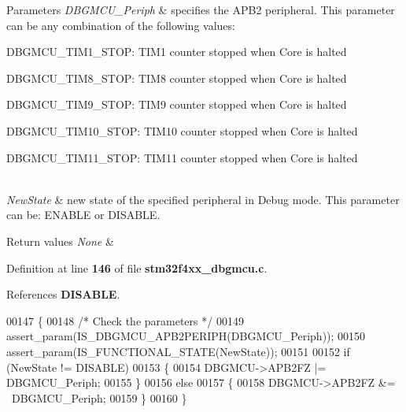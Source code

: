 \begin{DoxyParams}{Parameters}
{\em D\+B\+G\+M\+C\+U\+\_\+\+Periph} & specifies the A\+P\+B2 peripheral. This parameter can be any combination of the following values\+: \begin{DoxyItemize}
\item D\+B\+G\+M\+C\+U\+\_\+\+T\+I\+M1\+\_\+\+S\+T\+OP\+: T\+I\+M1 counter stopped when Core is halted \item D\+B\+G\+M\+C\+U\+\_\+\+T\+I\+M8\+\_\+\+S\+T\+OP\+: T\+I\+M8 counter stopped when Core is halted \item D\+B\+G\+M\+C\+U\+\_\+\+T\+I\+M9\+\_\+\+S\+T\+OP\+: T\+I\+M9 counter stopped when Core is halted \item D\+B\+G\+M\+C\+U\+\_\+\+T\+I\+M10\+\_\+\+S\+T\+OP\+: T\+I\+M10 counter stopped when Core is halted \item D\+B\+G\+M\+C\+U\+\_\+\+T\+I\+M11\+\_\+\+S\+T\+OP\+: T\+I\+M11 counter stopped when Core is halted \end{DoxyItemize}
\\
\hline
{\em New\+State} & new state of the specified peripheral in Debug mode. This parameter can be\+: E\+N\+A\+B\+LE or D\+I\+S\+A\+B\+LE. \\
\hline
\end{DoxyParams}

\begin{DoxyRetVals}{Return values}
{\em None} & \\
\hline
\end{DoxyRetVals}


Definition at line \textbf{ 146} of file \textbf{ stm32f4xx\+\_\+dbgmcu.\+c}.



References \textbf{ D\+I\+S\+A\+B\+LE}.


\begin{DoxyCode}
00147 \{
00148   \textcolor{comment}{/* Check the parameters */}
00149   assert_param(IS_DBGMCU_APB2PERIPH(DBGMCU\_Periph));
00150   assert_param(IS_FUNCTIONAL_STATE(NewState));
00151 
00152   \textcolor{keywordflow}{if} (NewState != DISABLE)
00153   \{
00154     DBGMCU->APB2FZ |= DBGMCU\_Periph;
00155   \}
00156   \textcolor{keywordflow}{else}
00157   \{
00158     DBGMCU->APB2FZ &= ~DBGMCU\_Periph;
00159   \}
00160 \}
\end{DoxyCode}
\mbox{\label{group__DBGMCU__Private__Functions_gadf2f267f855ac1e4c03905c5dcfbd28b}} 
